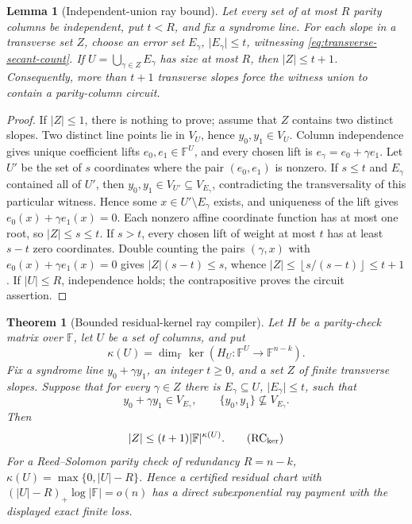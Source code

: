 \documentclass[11pt,a4paper]{amsart}
\numberwithin{equation}{section}
\newtheorem{theorem}{Theorem}[section]
\newtheorem{lemma}[lemma]{Lemma}
\theoremstyle{remark}
\newcommand{\F}{\mathbb F}
\newcommand{\abs}[1]{\lvert #1\rvert}
\newcommand{\floor}[1]{\left\lfloor #1\right\rfloor}
\begin{document}
\begin{lemma}[Independent-union ray bound]
\label{lem:independent-union-rays}
Let every set of at most \(R\) parity columns be independent, put
\(t<R\), and fix a syndrome line.  For each slope in a transverse set
\(Z\), choose an error set \(E_\gamma\), \(\abs{E_\gamma}\le t\),
witnessing \eqref{eq:transverse-secant-count}.  If
\(U=\bigcup_{\gamma\in Z}E_\gamma\) has size at most \(R\), then
\(\abs Z\le t+1\).  Consequently, more than \(t+1\) transverse slopes
force the witness union to contain a parity-column circuit.
\end{lemma}

\begin{proof}
If \(\abs Z\le1\), there is nothing to prove; assume that \(Z\) contains
two distinct slopes.  Two distinct line points lie in \(V_U\), hence
\(y_0,y_1\in V_U\).
Column independence gives unique coefficient lifts
\(e_0,e_1\in\F^U\), and every chosen lift is
\(e_\gamma=e_0+\gamma e_1\).  Let \(U'\) be the set of \(s\) coordinates
where the pair \((e_0,e_1)\) is nonzero.  If \(s\le t\) and
\(E_\gamma\) contained all of \(U'\), then
\(y_0,y_1\in V_{U'}\subseteq V_{E_\gamma}\), contradicting the
transversality of this particular witness.  Hence some
\(x\in U'\setminus E_\gamma\) exists, and uniqueness of the lift gives
\(e_0(x)+\gamma e_1(x)=0\).  Each nonzero affine coordinate function has
at most one root, so \(\abs Z\le s\le t\).  If \(s>t\), every chosen lift of
weight at most \(t\) has at least \(s-t\) zero coordinates.  Double
counting the pairs \((\gamma,x)\) with
\(e_0(x)+\gamma e_1(x)=0\) gives
\(\abs Z(s-t)\le s\), whence
\(\abs Z\le\floor{s/(s-t)}\le t+1\).  If \(\abs U\le R\), independence
holds; the contrapositive proves the circuit assertion.
\end{proof}

\begin{theorem}[Bounded residual-kernel ray compiler]
\label{thm:bounded-residual-kernel-ray}
Let \(H\) be a parity-check matrix over \(\F\), let \(U\) be a set of
columns, and put
\[
 \kappa(U)=\dim_\F\ker(H_U:\F^U\longrightarrow\F^{n-k}).
\]
Fix a syndrome line \(y_0+\gamma y_1\), an integer \(t\ge0\), and a set
\(Z\) of finite transverse slopes.  Suppose that for every \(\gamma\in Z\)
there is \(E_\gamma\subseteq U\), \(\abs{E_\gamma}\le t\), such that
\[
 y_0+\gamma y_1\in V_{E_\gamma},\qquad
 \{y_0,y_1\}\not\subseteq V_{E_\gamma}.
\]
Then
\[
                  \abs Z\le(t+1)\abs{\F}^{\kappa(U)}. \tag{RC$_{\rm ker}$}
\]
For a Reed--Solomon parity check of redundancy \(R=n-k\),
\(\kappa(U)=\max\{0,\abs U-R\}\).  Hence a certified residual chart with
\((\abs U-R)_+\log\abs\F=o(n)\) has a direct subexponential ray payment
with the displayed exact finite loss.
\end{theorem}
\end{document}
